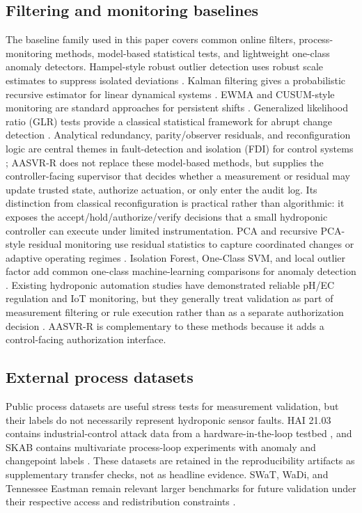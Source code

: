 \documentclass[preprint,12pt,doubleblind]{elsarticle}
\begin{document}
\subsection{Filtering and monitoring baselines}
The baseline family used in this paper covers common online filters, process-monitoring methods, model-based statistical tests, and lightweight one-class anomaly detectors. Hampel-style robust outlier detection uses robust scale estimates to suppress isolated deviations \cite{hampel1974influence}. Kalman filtering gives a probabilistic recursive estimator for linear dynamical systems \cite{kalman1960new}. EWMA and CUSUM-style monitoring are standard approaches for persistent shifts \cite{roberts1959control,page1954continuous}. Generalized likelihood ratio (GLR) tests provide a classical statistical framework for abrupt change detection \cite{basseville1993detection}. Analytical redundancy, parity/observer residuals, and reconfiguration logic are central themes in fault-detection and isolation (FDI) for control systems \cite{patton1989fault,isermann2005fault,hwang2010survey}; AASVR-R does not replace these model-based methods, but supplies the controller-facing supervisor that decides whether a measurement or residual may update trusted state, authorize actuation, or only enter the audit log. Its distinction from classical reconfiguration is practical rather than algorithmic: it exposes the accept/hold/authorize/verify decisions that a small hydroponic controller can execute under limited instrumentation. PCA and recursive PCA-style residual monitoring use residual statistics to capture coordinated changes or adaptive operating regimes \cite{hotelling1947multivariate,jackson1979control,li2000recursive}. Isolation Forest, One-Class SVM, and local outlier factor add common one-class machine-learning comparisons for anomaly detection \cite{liu2008isolation,scholkopf2001estimating,breunig2000lof}. Existing hydroponic automation studies have demonstrated reliable pH/EC regulation and IoT monitoring, but they generally treat validation as part of measurement filtering or rule execution rather than as a separate authorization decision \cite{tatas2022reliable,domingues2012automated}. AASVR-R is complementary to these methods because it adds a control-facing authorization interface.

\subsection{External process datasets}
Public process datasets are useful stress tests for measurement validation, but their labels do not necessarily represent hydroponic sensor faults. HAI 21.03 contains industrial-control attack data from a hardware-in-the-loop testbed \cite{shin2021haicon}, and SKAB contains multivariate process-loop experiments with anomaly and changepoint labels \cite{skab2020}. These datasets are retained in the reproducibility artifacts as supplementary transfer checks, not as headline evidence. SWaT, WaDi, and Tennessee Eastman remain relevant larger benchmarks for future validation under their respective access and redistribution constraints \cite{swatDataset,wadiDataset,tepDataset}.
\end{document}
